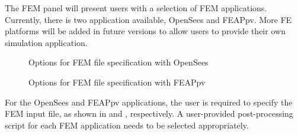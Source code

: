 The FEM panel will present users with a selection of FEM
applications. Currently, there is two application
available, OpenSees and FEAPpv. More FE platforms will be added 
 in future versions to allow users to provide their own
simulation application.  

\begin{figure}[!htbp]
  \caption{Options for FEM file specification with OpenSees}
  \label{fig:fem}
\end{figure}

\begin{figure}[!htbp]
  \caption{Options for FEM file specification with FEAPpv}
  \label{fig:fem2}
\end{figure}

For the OpenSees and FEAPpv applications, the user is required to specify the FEM input file, as shown in  and , respectively. A user-provided post-processing script for each FEM application needs to be selected appropriately. 